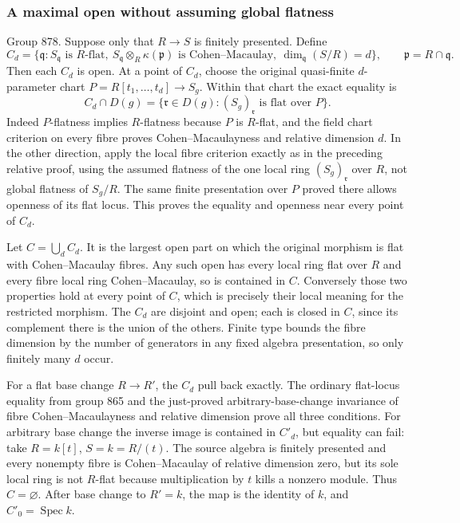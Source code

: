\subsubsection{A maximal open without assuming global flatness}\label{algebra-proof-040-a-maximal-open-without-assuming-global-flatness}

Group 878. Suppose only that \(R\to S\) is finitely presented. Define \[
C_d=\{\mathfrak q:S_{\mathfrak q}\text{ is }R\text{-flat},
\ S_{\mathfrak q}\otimes_R\kappa(\mathfrak p)\text{ is Cohen–Macaulay},
\ \dim_{\mathfrak q}(S/R)=d\},
\qquad \mathfrak p=R\cap\mathfrak q.
\] Then each \(C_d\) is open. At a point of \(C_d\), choose the original quasi-finite \(d\)-parameter chart \(P=R[t_1,\ldots,t_d]\to S_g\). Within that chart the exact equality is \[
C_d\cap D(g)
=\{\mathfrak r\in D(g):(S_g)_{\mathfrak r}
       \text{ is flat over }P\}.
\] Indeed \(P\)-flatness implies \(R\)-flatness because \(P\) is \(R\)-flat, and the field chart criterion on every fibre proves Cohen--Macaulayness and relative dimension \(d\). In the other direction, apply the local fibre criterion exactly as in the preceding relative proof, using the assumed flatness of the one local ring \((S_g)_{\mathfrak r}\) over \(R\), not global flatness of \(S_g/R\). The same finite presentation over \(P\) proved there allows openness of its flat locus. This proves the equality and openness near every point of \(C_d\).

Let \(C=\bigcup_d C_d\). It is the largest open part on which the original morphism is flat with Cohen--Macaulay fibres. Any such open has every local ring flat over \(R\) and every fibre local ring Cohen--Macaulay, so is contained in \(C\). Conversely those two properties hold at every point of \(C\), which is precisely their local meaning for the restricted morphism. The \(C_d\) are disjoint and open; each is closed in \(C\), since its complement there is the union of the others. Finite type bounds the fibre dimension by the number of generators in any fixed algebra presentation, so only finitely many \(d\) occur.

For a flat base change \(R\to R'\), the \(C_d\) pull back exactly. The ordinary flat-locus equality from group 865 and the just-proved arbitrary-base-change invariance of fibre Cohen--Macaulayness and relative dimension prove all three conditions. For arbitrary base change the inverse image is contained in \(C'_d\), but equality can fail: take \(R=k[t]\), \(S=k=R/(t)\). The source algebra is finitely presented and every nonempty fibre is Cohen--Macaulay of relative dimension zero, but its sole local ring is not \(R\)-flat because multiplication by \(t\) kills a nonzero module. Thus \(C=\varnothing\). After base change to \(R'=k\), the map is the identity of \(k\), and \(C'_0=\operatorname{Spec}k\).

